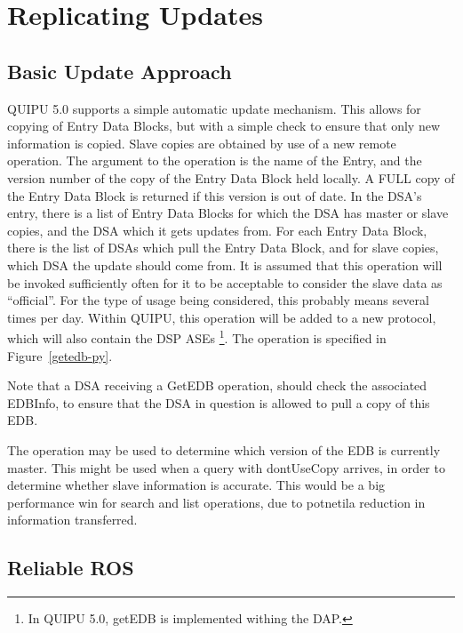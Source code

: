 \chapter {Replicating Updates}
\label {des-first}
\label {dist-update}


\section {Basic Update Approach}
\label {edb-ros}

QUIPU 5.0 supports a simple automatic update
mechanism.
This allows for copying of Entry Data Blocks,
but with a simple check to ensure that only new information is copied.
Slave copies are obtained by use of a new remote operation.
The argument to the operation is the name of the Entry, and the
version number of the copy of the Entry Data Block held
locally.
A FULL copy of the Entry Data Block is returned if this version
is out of date.
In the DSA's entry, there is a list of Entry Data Blocks for which the DSA
has master or slave copies, and the DSA which it gets updates from.
For each Entry Data Block, there is the list of DSAs which pull the Entry
Data Block, and for slave copies, which DSA the update should come from.
It is assumed that this operation will be invoked sufficiently
often for it to be acceptable to consider the slave data as
``official''.
For the type of usage being considered, this probably means several
times per day.
Within QUIPU, this operation will be added to a new protocol, which will
also contain the DSP ASEs \footnote{In QUIPU 5.0, getEDB is implemented
withing the DAP.}.
The operation is specified in Figure~\ref{getedb-py}.

\clearpage

Note that a DSA receiving a GetEDB operation, should check the associated
EDBInfo, to ensure that the DSA in question is allowed to pull a copy of
this EDB.

The operation may be used to determine which version of the EDB is currently
master.  This might be used when a query with dontUseCopy arrives, in order
to determine whether slave information is accurate.  This would be a big
performance win for search and list operations, due to potnetila reduction
in information transferred.

\section  {Reliable ROS}

